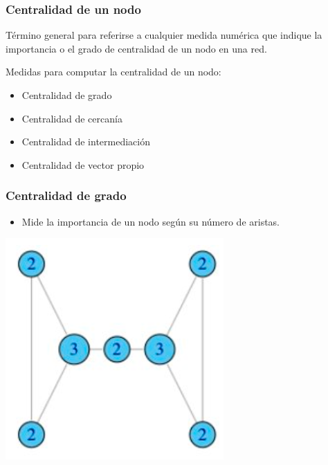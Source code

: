 \documentclass[
10pt, %
aspectratio=169, %
]{beamer}
\begin{document}
	\begin{frame}
		
		\frametitle{Centralidad de un nodo}
		
		\begin{alertblock}{}
			Término general para referirse a cualquier medida numérica que indique la importancia o el grado de centralidad de un nodo en una red. 
		\end{alertblock}
		
		\vspace{2\baselineskip}
		
		Medidas para computar la centralidad de un nodo:
		\begin{itemize}
			\item Centralidad de grado
			\item Centralidad de cercanía
			\item Centralidad de intermediación
			\item Centralidad de vector propio
		\end{itemize}
		
	\end{frame}
	
	\begin{frame}
		
		\frametitle{Centralidad de grado}
		
		\begin{minipage}{0.45\textwidth}
			
			\begin{itemize}
				\item Mide la importancia de un nodo según su número de aristas.
			\end{itemize}
			
		\end{minipage}%
		\hfill
		\begin{minipage}{0.45\textwidth}
			
			\centering
			\includegraphics[scale=0.4]{centralidad-grado.png}
			
		\end{minipage}%
		
	\end{frame}
	
\end{document}
